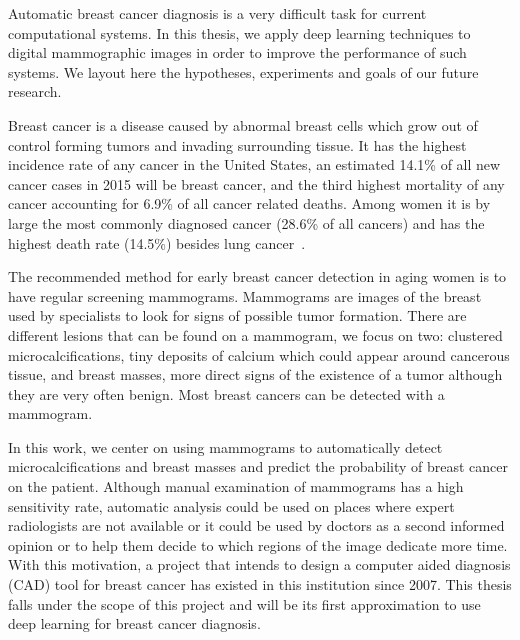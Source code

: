 \begin{comment} 
Hook(first paragarpah) : Automatic breast cancer diagnosis is a very difficult taks for current automatic computationnal systems. In this article,  we apply deep learning techniques to digital mammogrpahic images and obtain better results than presented to date. We show or prove or use this technique to obtain this... (when we have results)
\end{comment}
Automatic breast cancer diagnosis is a very difficult task for current computational systems. In this thesis, we apply deep learning techniques to digital mammographic images in order to improve the performance of such systems. We layout here the hypotheses, experiments and goals of our future research.

Breast cancer is a disease caused by abnormal breast cells which grow out of control forming tumors and invading surrounding tissue.
It has the highest incidence rate of any cancer in the United States, an estimated 14.1\% of all new cancer cases in 2015 will be breast cancer, and the third highest mortality of any cancer accounting for 6.9\% of all cancer related deaths. Among women it is by large the most commonly diagnosed cancer (28.6\% of all cancers) and has the highest death rate (14.5\%) besides lung cancer~\cite{ACS2015}.

The recommended method for early breast cancer detection in aging women is to have regular screening mammograms. Mammograms are images of the breast used by specialists to look for signs of possible tumor formation. There are different lesions that can be found on a mammogram, we focus on two: clustered microcalcifications, tiny deposits of calcium which could appear around cancerous tissue, and breast masses, more direct signs of the existence of a tumor although they are very often benign. Most breast cancers can be detected with a mammogram.%

In this work, we center on using mammograms to automatically detect microcalcifications and breast masses and predict the probability of breast cancer on the patient. Although manual examination of mammograms has a high sensitivity rate, automatic analysis could be used on places where expert radiologists are not available or it could be used by doctors as a second informed opinion or to help them decide to which regions of the image dedicate more time. With this motivation, a project that intends to design a computer aided diagnosis (CAD) tool for breast cancer has existed in this institution since 2007. This thesis falls under the scope of this project and will be its first approximation to use deep learning for breast cancer diagnosis.

